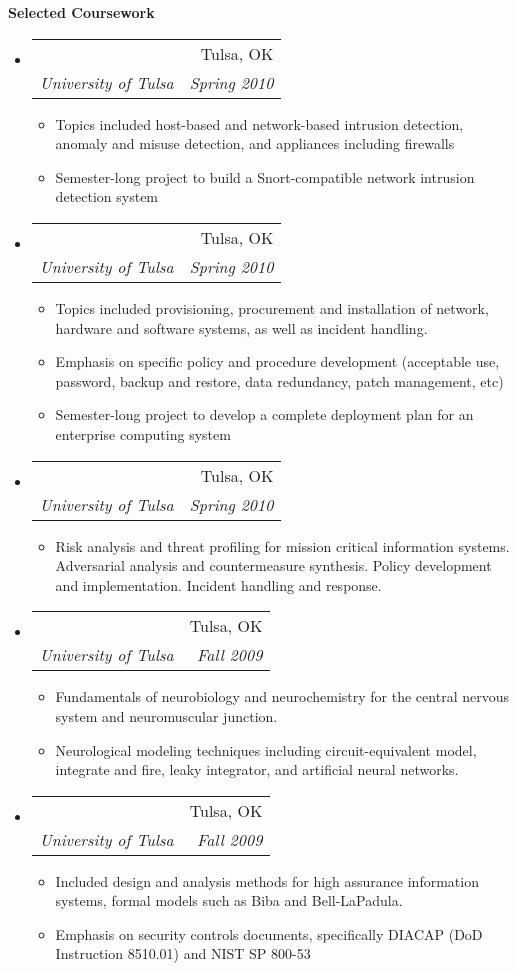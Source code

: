 \documentclass[letterpaper,11pt]{article}
\makeatletter
\newcommand{\resitem}[1]{\item #1 \vspace{-2pt}}
\newcommand{\resheading}[1]{{\large \colorbox{mygrey}{\begin{minipage}{\textwidth}{\textbf{#1 \vphantom{p\^{E}}}}\end{minipage}}}}
\newcommand{\ressubheading}[4]{
\begin{tabular*}{6.5in}{l@{\extracolsep{\fill}}r}
		\textbf{\parbox{5in}{\raggedright #1 }} & #2 \\
		\textit{#3} & \textit{#4} \\
\end{tabular*}\vspace{-6pt}}
\makeatother
\begin{document}
\resheading{Selected Coursework}
\begin{itemize}

\item
	\ressubheading{Network Security}{Tulsa, OK}{University of Tulsa}{Spring 2010}
	\begin{itemize}
		\resitem{Topics included host-based and network-based intrusion detection, anomaly and misuse detection, and appliances including firewalls}
		\resitem{Semester-long project to build a Snort-compatible network intrusion detection system}
	\end{itemize}
\item
	\ressubheading{Secure System Administration}{Tulsa, OK}{University of Tulsa}{Spring 2010}
	\begin{itemize}
		\resitem{Topics included provisioning, procurement and installation of network, hardware and software systems, as well as incident handling.}
		\resitem{Emphasis on specific policy and procedure development (acceptable use, password, backup and restore, data redundancy, patch management, etc)}
		\resitem{Semester-long project to develop a complete deployment plan for an enterprise computing system}
	\end{itemize}
\item
	\ressubheading{Risk Management for Information Systems}{Tulsa, OK}{University of Tulsa}{Spring 2010}
	\begin{itemize}
		\resitem{Risk analysis and threat profiling for mission critical information systems. Adversarial analysis and countermeasure synthesis. Policy development and implementation. Incident handling and response.}
	\end{itemize}
\item
	\ressubheading{Computational Neuroscience}{Tulsa, OK}{University of Tulsa}{Fall 2009}
	\begin{itemize}
		\resitem{Fundamentals of neurobiology and neurochemistry for the central nervous system and neuromuscular junction.}
		\resitem{Neurological modeling techniques including circuit-equivalent model, integrate and fire, leaky integrator, and artificial neural networks.}
	\end{itemize}
\item
	\ressubheading{Information Systems Assurance}{Tulsa, OK}{University of Tulsa}{Fall 2009}
	\begin{itemize}
		\resitem{Included design and analysis methods for high assurance information systems, formal models such as Biba and Bell-LaPadula.}
		\resitem{Emphasis on security controls documents, specifically DIACAP (DoD Instruction 8510.01) and NIST SP 800-53}

\end{itemize}
\end{itemize}
\end{document}
